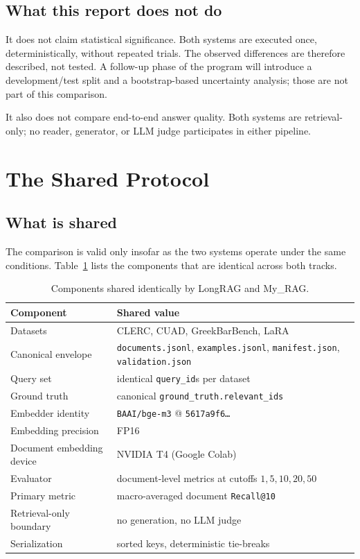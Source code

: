 \documentclass[11pt,a4paper]{article}
\begin{document}
\subsection{What this report does not do}
It does not claim statistical significance. Both systems are executed
once, deterministically, without repeated trials. The observed
differences are therefore described, not tested. A follow-up phase
of the program will introduce a development/test split and a
bootstrap-based uncertainty analysis; those are not part of this
comparison.

It also does not compare end-to-end answer quality. Both systems are
retrieval-only; no reader, generator, or LLM judge participates in
either pipeline.

\section{The Shared Protocol}\label{sec:protocol}

\subsection{What is shared}
The comparison is valid only insofar as the two systems operate
under the same conditions. Table~\ref{tab:shared} lists the
components that are identical across both tracks.

\begin{table}[h]
\centering
\caption{Components shared identically by LongRAG and My\_RAG.}
\label{tab:shared}
\small
\begin{tabular}{p{5.5cm} p{9.5cm}}
\toprule
\textbf{Component} & \textbf{Shared value} \\
\midrule
Datasets & CLERC, CUAD, GreekBarBench, LaRA \\
Canonical envelope & \texttt{documents.jsonl}, \texttt{examples.jsonl},
  \texttt{manifest.json}, \texttt{validation.json} \\
Query set & identical \texttt{query\_id}s per dataset \\
Ground truth & canonical \texttt{ground\_truth.relevant\_ids} \\
Embedder identity & \texttt{BAAI/bge-m3} @
  \texttt{5617a9f6\dots} \\
Embedding precision & FP16 \\
Document embedding device & NVIDIA T4 (Google Colab) \\
Evaluator & document-level metrics at cutoffs $1,5,10,20,50$ \\
Primary metric & macro-averaged document \texttt{Recall@10} \\
Retrieval-only boundary & no generation, no LLM judge \\
Serialization & sorted keys, deterministic tie-breaks \\
\bottomrule
\end{tabular}
\end{table}
\end{document}
